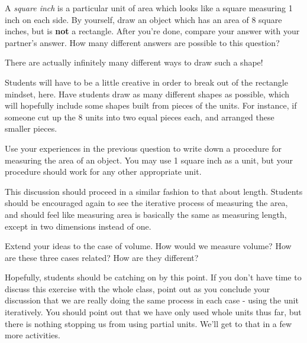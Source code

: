 \documentclass[handout]{ximera}
\begin{document}
\begin{problem}
A {\it square inch} is a particular unit of area which looks like a square measuring 1 inch on each side.  By yourself, draw an object which has an area of 8 square inches, but is {\bf not} a rectangle.  After you're done, compare your answer with your partner's answer.  How many different answers are possible to this question?

\begin{solution}    
There are actually infinitely many different ways to draw such a shape!
\end{solution}
\begin{instructorNotes}
Students will have to be a little creative in order to break out of the rectangle mindset, here.  Have students draw as many different shapes as possible, which will hopefully include some shapes built from pieces of the units.  For instance, if someone cut up the 8 units into two equal pieces each, and arranged these smaller pieces.
\end{instructorNotes}
\end{problem}

\begin{problem}
Use your experiences in the previous question to write down a procedure for measuring the area of an object.  You may use 1 square inch as a unit, but your procedure should work for any other appropriate unit.  

\begin{instructorNotes}
This discussion should proceed in a similar fashion to that about length.  Students should be encouraged again to see the iterative process of measuring the area, and should feel like measuring area is basically the same as measuring length, except in two dimensions instead of one.
\end{instructorNotes}
\end{problem}

\begin{problem}
Extend your ideas to the case of volume.  How would we measure volume?  How are these three cases related?  How are they different?

\begin{instructorNotes}
Hopefully, students should be catching on by this point.  If you don't have time to discuss this exercise with the whole class, point out as you conclude your discussion that we are really doing the same process in each case - using the unit iteratively.  You should point out that we have only used whole units thus far, but there is nothing stopping us from using partial units.  We'll get to that in a few more activities.
\end{instructorNotes}
\end{problem}
\end{document}
